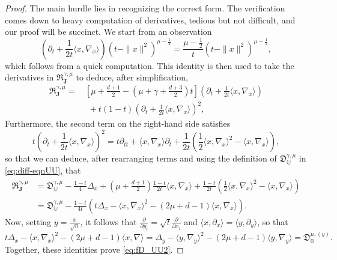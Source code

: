 \documentclass[10pt,a4paper]{amsart}
\def\BB{{\mathbb B}}
\def\Jb{{\mathbf J}}
\def\UU{{\mathbb U}}
\def\f{\frac}
\def\fD{{\mathfrak D}}
\def\fR{{\mathfrak R}}
\def\g{{\gamma}}
\def\la{{\langle}}
\def\ra{{\rangle}}
\begin{document}
\begin{proof}
The main hurdle lies in recognizing the correct form. The verification comes down to heavy computation of
derivatives, tedious but not difficult, and our proof will be succinct. We start from an observation 
$$
   \left(\partial_t + \frac{1}{2t} \la x,\nabla_x\ra \right) (t-\|x\|^2)^{\mu - \frac12}
    = \frac{\mu - \f12}{t} (t-\|x\|^2)^{\mu-\f12},
$$
which follows from a quick computation. This identity is then used to take the derivatives in $\fR_\Jb^{\g,\mu}$ to
deduce, after simplification, 
\begin{align*}
 \fR_\Jb^{\g,\mu} 
  = \,& \left[ \mu+ \frac {d+1} 2 - \left(\mu+\g+ \frac {d+3} 2 \right)t \right]  \left( \partial_t + \frac{1}{2t} \la x ,\nabla_x\ra \right) \\
    & \,\, + t(1-t)  \left( \partial_t + \frac{1}{2t} \la x ,\nabla_x\ra \right)^2, 
\end{align*}
Furthermore, the second term on the right-hand side satisfies 
\begin{equation*}
   t \left( \partial_t + \frac{1}{2t} \la x ,\nabla_x\ra \right)^2 = t \partial_{tt} + \la x, \nabla_x \ra \partial_t + 
      \frac{1}{2t} \left( \frac 12 \la x, \nabla_x\ra^2 - \la x, \nabla_x\ra \right),
\end{equation*}
so that we can deduce, after rearranging terms and using the definition of $\fD_\UU^{\g,\mu}$ in \eqref{eq:diff-eqnUU}, that 
\begin{align*}
 \fR_\Jb^{\g,\mu}& =  \fD_\UU^{\g,\mu} -\frac{1-t}4 \Delta_x + \left (\mu+\frac{d+1}{2}\right )\frac{1-t}{2t} \la x, \nabla_x \ra
  +   \frac{1-t}{2t} \left( \frac 12 \la x, \nabla_x\ra^2 - \la x, \nabla_x\ra \right)\\
  & =  \fD_\UU^{\g,\mu} - \frac{1-t}{4t} \left(t \Delta_x - \la x, \nabla_x \ra^2 - (2\mu+d-1) \la x, \nabla_x \ra \right).
\end{align*}  
Now, setting $y = \frac{x}{\sqrt{n}}$, it follows that $\frac{\partial}{\partial y_i} = \sqrt{t}  \frac{\partial}{\partial x_i}$
and $\la x, \partial_x\ra = \la y, \partial_y\ra$, so that 
$$
t \Delta_x - \la x, \nabla_x \ra^2 - (2\mu+d-1) \la x, \nabla \ra = \Delta_y - \la y, \nabla_y \ra^2 - (2\mu+d-1) \la y, \nabla_y \ra
 = \fD_\BB^{\mu, (y)}.
$$
Together, these identities prove \eqref{eq:fD_UU2}. 


\end{proof}
\end{document}
